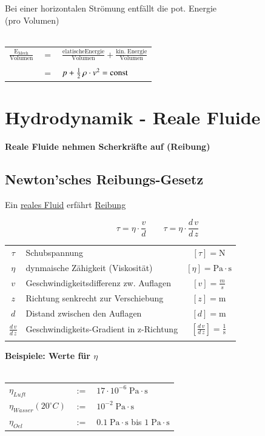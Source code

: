 Bei einer horizontalen Strömung entfällt die pot. Energie\\
(pro Volumen) \\
\\

\begin{tabular}{l c l}
$ \mathrm{ \frac{E_{Mech}}{Volumen}}$ & $=$ & $\mathrm{ \frac{elatische Energie}{Volumen} + \frac{kin. \; Energie}{Volumen} }$ \\
\\
& $=$ & $ p + \frac{1}{2} \, \rho \cdot v^2 = \mathrm{const}$ \\
\end{tabular}





\section{Hydrodynamik - Reale Fluide}

\textbf{Reale Fluide nehmen Scherkräfte auf (Reibung)}


\subsection{Newton'sches Reibungs-Gesetz}
Ein \underline{reales Fluid} erfährt \underline{Reibung} 

$$ \boxed{ \tau = \eta \cdot \frac{v}{d} }  \qquad  \boxed{ \tau = \eta \cdot \frac{d \, v}{d \, z} } $$

\begin{tabular}{c l c}
		$\tau$ & Schubspannung & $[\tau] = \mathrm{N}$ \\
		$\eta$ & dynmaische Zähigkeit (Viskosität) & $[\eta] = \mathrm{Pa \cdot s}$ \\
		\rule{0pt}{8pt}$v$ & Geschwindigkeitsdifferenz zw. Auflagen & $[v] = \frac{m}{s}$ \\
		$z$ & Richtung senkrecht zur Verschiebung & $[z] = \mathrm{m}$ \\
		$d$ & Distand zwischen den Auflagen & $[d] = \mathrm{m}$ \\
		\rule{0pt}{8pt}$\frac{d \, v}{d \, z}$ & Geschwindigkeits-Gradient in z-Richtung & $[\frac{d \, v}{d \, z}] = \mathrm{\frac{1}{s}}$ \\
		\\
\end{tabular}
	
\textbf{Beispiele: Werte für $\eta$} \\
\\
\begin{tabular}{l c l}
		$\eta_{Luft}$ & $:=$ & $17 \cdot 10^{-6} \; \mathrm{Pa \cdot s} $ \\
		$\eta_{Wasser} (20^{\circ}C)$ & $:=$ & $10^{-2} \; \mathrm{Pa \cdot s}$ \\
		$\eta_{Oel}$ & $:=$ & $0.1 \; \mathrm{Pa \cdot s}$ bis $1 \; \mathrm{Pa \cdot s}$ \\
\end{tabular}


